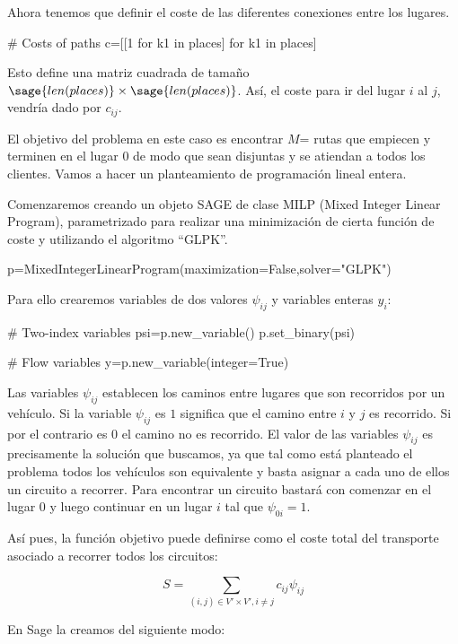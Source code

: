 \documentclass{article}
\begin{document}
Ahora tenemos que definir el coste de las diferentes conexiones entre los lugares.

\begin{sageblock}
# Costs of paths
c=[[1 for k1 in places] for k1 in places]
\end{sageblock}

Esto define una matriz cuadrada de tamaño $\sage{len(places)} \times \sage{len(places)}$. Así, el coste para ir del lugar $i$ al $j$, vendría dado por $c_{ij}$.

El objetivo del problema en este caso es encontrar $M$= rutas que empiecen y terminen en el lugar $0$ de modo que sean disjuntas y se atiendan a todos los clientes. Vamos a hacer un planteamiento de programación lineal entera.

Comenzaremos creando un objeto SAGE de clase MILP (Mixed Integer Linear Program), parametrizado para realizar una minimización de cierta función de coste y utilizando el algoritmo ``GLPK''.

\begin{sageblock}
p=MixedIntegerLinearProgram(maximization=False,solver="GLPK")
\end{sageblock}

Para ello crearemos variables de dos valores $\psi_{ij}$ y variables enteras $y_i$:

\begin{sageblock}
# Two-index variables
psi=p.new_variable()
p.set_binary(psi)

# Flow variables
y=p.new_variable(integer=True)
\end{sageblock}

Las variables $\psi_{ij}$ establecen los caminos entre lugares que son recorridos por un vehículo. Si la variable $\psi_{ij}$ es $1$ significa que el camino entre $i$ y $j$ es recorrido. Si por el contrario es $0$ el camino no es recorrido. El valor de las variables $\psi_{ij}$ es precisamente la solución que buscamos, ya que tal como está planteado el problema todos los vehículos son equivalente y basta asignar a cada uno de ellos un circuito a recorrer. Para encontrar un circuito bastará con comenzar en el lugar $0$ y luego continuar en un lugar $i$ tal que $\psi_{0i}=1$.

Así pues, la función objetivo puede definirse como el coste total del transporte asociado a recorrer todos los circuitos:

$$S=\sum_{(i,j) \in V' \times V', i \neq j} c_{ij}\psi_{ij}$$

En Sage la creamos del siguiente modo:
\end{document}
